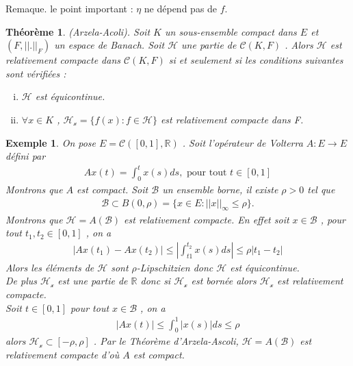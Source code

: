 \documentclass{report}
\newtheorem{Ex}{Exemple}[subsection]
\newtheorem{The}{Théorème}[subsection]
\begin{document}
{Remaque. le point important : $\eta$ ne dépend pas de $f$.\\




\begin{The} (Arzela-Acoli). Soit $K$ un sous-ensemble compact dans $E$ et $(F, ||.||_F)$ un espace de Banach. Soit $\mathscr{H}$ une partie de $\mathscr{C}(K,F)$ . Alors $\mathscr{H}$ est relativement compacte dans $\mathscr{C}(K, F)$ si et seulement si les conditions suivantes sont vérifiées :
	\begin{enumerate}[i)]
	\item  $\mathscr{H}$ est équicontinue.
	\item $\forall x \in K$ , $\mathscr{H_x} = \{f(x) : f \in \mathscr{H}\}$ est relativement compacte dans F.
\end{enumerate}
\end{The}

\begin{Ex} On pose $E = \mathscr{C}([0,1],\mathbb{R})$ . Soit l'opérateur de Volterra $A: E \rightarrow E$ défini par 
					\begin{align*}
							 A x(t) = \int_{0}^{t} x(s) ds , \,\,\text{pour tout}\,\, t \in [0,1] 
					\end{align*}
	Montrons que $A$ est compact.
	Soit $\mathscr{B}$ un ensemble borne, il existe $\rho > 0$ tel que 
					\begin{align*}
							 \mathscr{B} \subset B(0, \rho) = \{x \in E : ||x||_{\infty} \le \rho\} .
					\end{align*}
	Montrons que $\mathscr{H} = A(\mathscr{B})$ est relativement compacte. En effet soit $x \in \mathscr{B}$ , pour tout $t_1, t_2 \in [0,1]$ , on a 
					\begin{align*}
							 |Ax(t_1) - Ax(t_2)| \le |\int_{t1}^{t_2} x(s) ds| \le \rho |t_1 - t_2| 
					\end{align*}
	Alors les éléments de $\mathscr{H}$ sont $\rho$-Lipschitzien donc $\mathscr{H}$ est équicontinue.\\

	De plus $\mathscr{H_x}$ est une partie de $\mathbb{R}$ donc si $\mathscr{H_x}$ est bornée alors $\mathscr{H_x}$ est relativement compacte.\\
	Soit $t\in [0,1]$ pour tout $x \in \mathscr{B}$ , on a 
					\begin{align*}
							 |A x(t)| \le \int_{0}^{1} |x(s)| ds \le \rho 
					\end{align*}
	alors $\mathscr{H_x} \subset [-\rho, \rho]$ . Par le Théorème d'Arzela-Ascoli, $\mathscr{H} = A(\mathscr{B})$ est relativement compacte d'où $A$ est compact.\\
\end{Ex}

}
\end{document}
